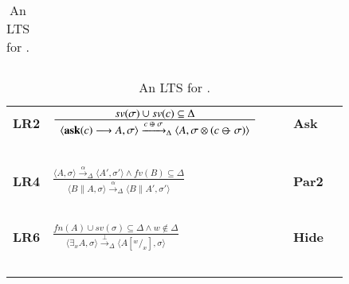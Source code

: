 \documentclass[main.tex]{subfiles}
\begin{document}
\begin{table}
{\begin{minipage}{0.5\linewidth}
\begin{center}
\begin{tabular}{llll}
  \end{tabular}
  \end{center}
 \end{minipage}
 \begin{minipage}{0.5\linewidth}
    \begin{center}
    \begin{tabular}{llll}
  \mbox{\bf LR2}& $\frac {\displaystyle   sv(\sigma) \cup sv(c) \subseteq \Delta}{\displaystyle
  \begin{array}{l} \langle \hbox{\ask}(c) \rrarrow A, \sigma \rangle \xrightarrow{c  \odivv  \sigma}_\Delta
               \langle A, \sigma \otimes (c\odivvv \sigma) \rangle
  \end{array}}$
  \ \ \ & \bf{Ask}&
  \\
  &\mbox{   }&\mbox{   }&
  \\
  \mbox{\bf LR4}& $\frac {\displaystyle \langle A,\sigma \rangle \xrightarrow{\alpha}_\Delta \langle A', \sigma'   \rangle
  \wedge fv(B) \subseteq \Delta} 
  {\displaystyle 
    \begin{array}{l} \langle B\parallel A, \sigma \rangle \xrightarrow{\alpha}_\Delta \langle B\parallel A', \sigma' \rangle
    \end{array}}$& \bf{Par2}&
  \\
  &\mbox{   }&\mbox{   }&
  \\
  \mbox{\bf LR6}& $\frac {\displaystyle fn(A) \cup sv(\sigma) \subseteq \Delta \wedge w \not \in \Delta }
  {\displaystyle\langle \exists_x A,\sigma\rangle \xrightarrow{\bot}_\Delta \langle A[^w/_x], \sigma\rangle}$
  &\bf{Hide}&
  \\
   &\mbox{   }&\mbox{   }&
  \\
  \end{tabular}
  \end{center}
 \end{minipage} 
}
\caption{An LTS for \SCCP.}
\label{fig:LTS}
\end{table}
\def\odiv{\, {\ominus\hspace{-6.8pt} \div} \,}
\def\odivvv{\; {\ominus\hspace{-4.7pt} \div} \;}
\end{document}
